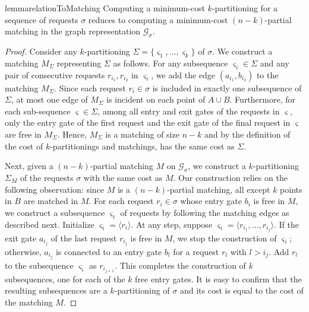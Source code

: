 \documentclass[11pt,onecolumn]{article}
\def\mcG{{\mathcal{G}}}
\newcommand{\requests}{\sigma}
\newcommand{\plan}{\Sigma}
\begin{document}
%

%
%

\begin{restatable}{lemma}{relationToMatching}\label{lemma:relationToMatching}
    Computing a minimum-cost $k$-partitioning for a sequence of requests $\requests$ reduces to computing a minimum-cost $(n-k)$-partial matching in the graph representation $\mcG_\requests$.
\end{restatable}
\begin{proof}
Consider any $k$-partitioning $\plan=\{\varsigma_1,\ldots, \varsigma_k\}$ of $\requests$. We construct a matching $M_\plan$ representing $\plan$ as follows. For any subsequence $\varsigma_i\in \plan$ and any pair of consecutive requests $r_{i_1}, r_{i_2}$ in $\varsigma_i$, we add the edge $(a_{i_1}, b_{i_2})$ to the matching $M_\plan$. Since each request $r_i\in\requests$ is included in exactly one subsequence of $\plan$, at most one edge of $M_\plan$ is incident on each point of $A\cup B$. Furthermore, for each sub-sequence $\varsigma\in\plan$, among all entry and exit gates of the requests in $\varsigma$, only the entry gate of the first request and the exit gate of the final request in $\varsigma$ are free in $M_\plan$. Hence, $M_\plan$ is a matching of size $n-k$ and by the definition of the cost of $k$-partitionings and matchings, has the same cost as $\plan$.

Next, given a $(n-k)$-partial matching $M$ on $\mcG_\requests$, we construct a $k$-partitioning $\plan_M$ of the requests $\requests$ with the same cost as $M$. Our construction relies on the following observation: since $M$ is a $(n-k)$-partial matching, all except $k$ points in $B$ are matched in $M$. For each request $r_i\in\requests$ whose entry gate $b_i$ is free in $M$, we construct a subsequence $\varsigma_i$ of requests by following the matching edges as described next. Initialize $\varsigma_i=\langle r_i\rangle$. At any step, suppose $\varsigma_i=\langle r_{i_1}, \ldots, r_{i_j}\rangle$. If the exit gate $a_{i_j}$ of the last request $r_{i_j}$ is free in $M$, we stop the construction of $\varsigma_i$; otherwise, $a_{i_j}$ is connected to an entry gate $b_{l}$ for a request $r_{l}$ with $l>i_j$. Add $r_l$ to the subsequence $\varsigma_i$ as $r_{i_{j+1}}$. This completes the construction of $k$ subsequences, one for each of the $k$ free entry gates. It is easy to confirm that the resulting subsequences are a $k$-partitioning of $\requests$ and its cost is equal to the cost of the matching $M$.
\end{proof}
\end{document}

